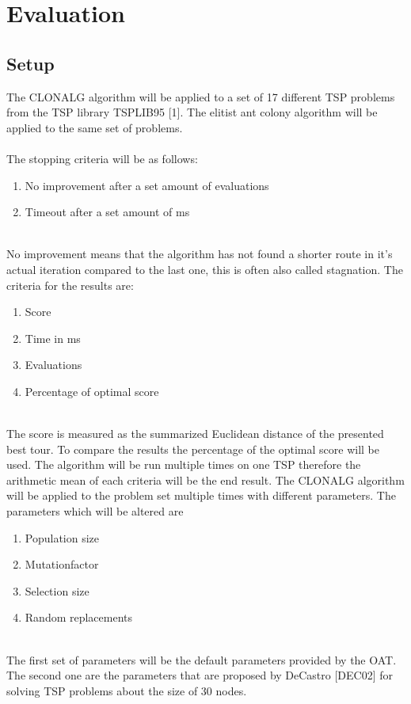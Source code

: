 \chapter{Evaluation}
\label{chap:eva}
\section{Setup}
The CLONALG algorithm will be applied to a set of 17 different TSP problems from the TSP library TSPLIB95 [1]. The elitist ant colony algorithm will be applied to the same set of problems.\\\\ 
The stopping criteria will be as follows:
\begin{enumerate}
	\item 	No improvement after a set amount of evaluations
	\item 	Timeout after a set amount of ms
\end{enumerate}\\
No improvement means that the algorithm has not found a shorter route in it's actual iteration compared to the last one, this is often also called stagnation. 
The criteria for the results are:
\begin{enumerate}
	\item 	Score
	\item 	Time in ms
	\item 	Evaluations	
	\item  	Percentage of optimal score
\end{enumerate}\\
The score is measured as the summarized Euclidean distance of the presented best tour. To compare the results the percentage of the optimal score will be used. The algorithm will be run multiple times on one TSP therefore the arithmetic mean of each criteria will be the end result. The CLONALG algorithm will be applied to the problem set multiple times with different parameters.
The parameters which will be altered are
\begin{enumerate}
	\item 	Population size
	\item 	Mutationfactor
	\item 	Selection size
	\item 	Random replacements	
\end{enumerate}\\
The first set of parameters will be the default parameters provided by the OAT. The second one are the parameters that are proposed by DeCastro [DEC02] for solving TSP problems about the size of 30 nodes.\\
